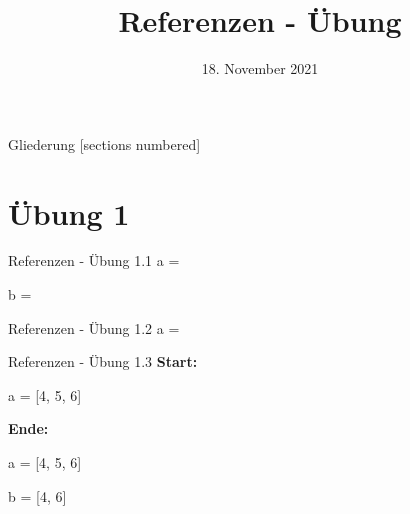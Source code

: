 



\title{Referenzen - Übung}
\date{18. November 2021}


\maketitle

\begin{frame}{Gliederung}
	[sections numbered]
	\tableofcontents
\end{frame}

\section{Übung 1}
\begin{frame}{Referenzen - Übung 1.1}
	\large
	a = \only<1>{?}\only<2>{\alert{[ [1, 5], [1, 5] ]}}
	
	b = \only<2>{\alert{[1, 5]}}
\end{frame}


\begin{frame}{Referenzen - Übung 1.2}
	\large
	a = \only<2>{\alert{[2, 3]}}
\end{frame}

\begin{frame}{Referenzen - Übung 1.3}
	\only<1>{
		\large
		
		\large
	}
	\only<2>{
		\large
		
	}
	\textbf{Start:}
	
	a = [4, 5, 6]
	\linebreak
	
	\textbf{Ende:}
	
	a = [4, 5, 6]
	
	b = [4, 6]
\end{frame}

